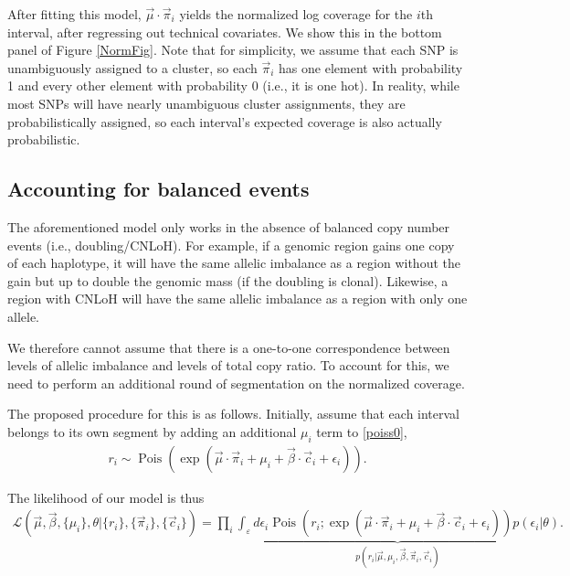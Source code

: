 \documentclass[10pt,letter]{article}
\numberwithin{equation}{section}
\newcommand{\textop}[1]{\operatorname{#1}}
\begin{document}
After fitting this model, $\vec\mu\cdot\vec\pi_i$ yields the normalized log coverage for the $i$th interval, after regressing out technical covariates. We show this in the bottom panel of Figure \ref{NormFig}. Note that for simplicity, we assume that each SNP is unambiguously assigned to a cluster, so each $\vec\pi_i$ has one element with probability 1 and every other element with probability 0 (i.e., it is one hot). In reality, while most SNPs will have nearly unambiguous cluster assignments, they are probabilistically assigned, so each interval's expected coverage is also actually probabilistic.

\subsection{Accounting for balanced events}

The aforementioned model only works in the absence of balanced copy number events (i.e., doubling/CNLoH). For example, if a genomic region gains one copy of each haplotype, it will have the same allelic imbalance as a region without the gain but up to double the genomic mass (if the doubling is clonal). Likewise, a region with CNLoH will have the same allelic imbalance as a region with only one allele.

We therefore cannot assume that there is a one-to-one correspondence between levels of allelic imbalance and levels of total copy ratio. To account for this, we need to perform an additional round of segmentation on the normalized coverage.

The proposed procedure for this is as follows. Initially, assume that each interval belongs to its own segment by adding an additional $\mu_i$ term to \eqref{poiss0},
\begin{align*}
r_i \sim \textop{Pois}(\exp(\vec\mu\cdot\vec \pi_i + \mu_i + \vec\beta\cdot\vec c_i + \epsilon_i)).
\end{align*}

The likelihood of our model is thus
\begin{align*}
\mathcal{L}(\vec \mu,\vec\beta,\{\mu_i\},\theta|\{r_i\},\{\vec \pi_i\},\{\vec c_i\}) = \prod_i \underbrace{\int_{\varepsilon} d\epsilon_i \textop{Pois}(r_i;\exp(\vec\mu\cdot\vec \pi_i + \mu_i + \vec\beta\cdot\vec c_i + \epsilon_i))p(\epsilon_i|\theta)}_{p(r_i|\vec\mu,\mu_i,\vec \beta,\vec \pi_i, \vec c_i)}.
\end{align*}
\end{document}
